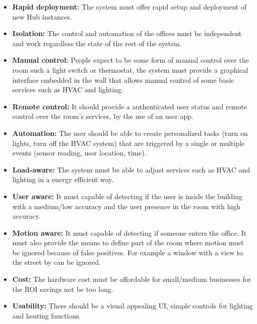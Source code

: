 \begin{itemize}
  \item \textbf{Rapid deployment:} The system must offer rapid setup and deployment of new Hub instances.
  
  \item \textbf{Isolation:} The control and automation of the offices must be independent and work regardless the state of the rest of the system.
  
  \item \textbf{Manual control:} People expect to be some form of manual control over the room such a light switch or thermostat, the system must provide a graphical interface embedded in the wall that allows manual control of some basic services such as \ac{HVAC} and lighting.
  
  \item \textbf{Remote control:} It should provide a authenticated user status and remote control over the room's services, by the use of an user app.
  
  \item \textbf{Automation:} The user should be able to create personalized tasks (turn on lights, turn off the \ac{HVAC} system) that are triggered by a single or multiple events (sensor reading, user location, time).
  
  \item \textbf{Load-aware:} The system must be able to adjust services such as HVAC and lighting in a energy efficient way.
  
  \item \textbf{User aware:} It must capable of detecting if the user is inside the building with a medium/low accuracy and the user presence in the room with high accuracy.
  
  \item \textbf{Motion aware:} It must capable of detecting if someone enters the office. It must also provide the means to define part of the room where motion must be ignored because of false positives. For example a window with a view to the street by can be ignored.
  
  
  \item \textbf{Cost:} The hardware cost must be affordable for small/medium businesses for the \ac{ROI} savings not be too long.
  
  \item \textbf{Usability:} There should be a visual appealing \ac{UI}, simple controls for lighting and heating functions.
    

\end{itemize}





